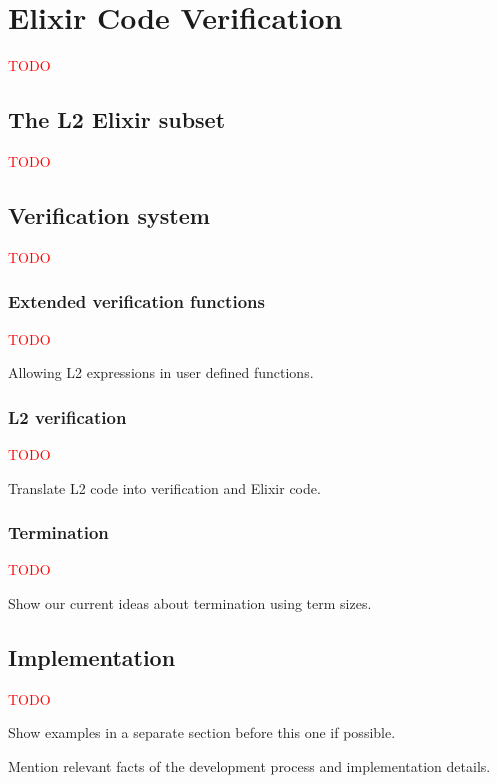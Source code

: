 \chapter{Elixir Code Verification}
\label{cap:elixirCodeVerification}

\textcolor{red}{TODO}

\section{The L2 Elixir subset}

\textcolor{red}{TODO}

\section{Verification system}

\textcolor{red}{TODO}

\subsection{Extended verification functions}

\textcolor{red}{TODO}

Allowing L2 expressions in user defined functions.

\subsection{L2 verification}

\textcolor{red}{TODO}

Translate L2 code into verification and Elixir code.

\subsection{Termination}

\textcolor{red}{TODO}

Show our current ideas about termination using term sizes.

\section{Implementation}

\textcolor{red}{TODO}

Show examples in a separate section before this one if possible.

Mention relevant facts of the development process and implementation details.
